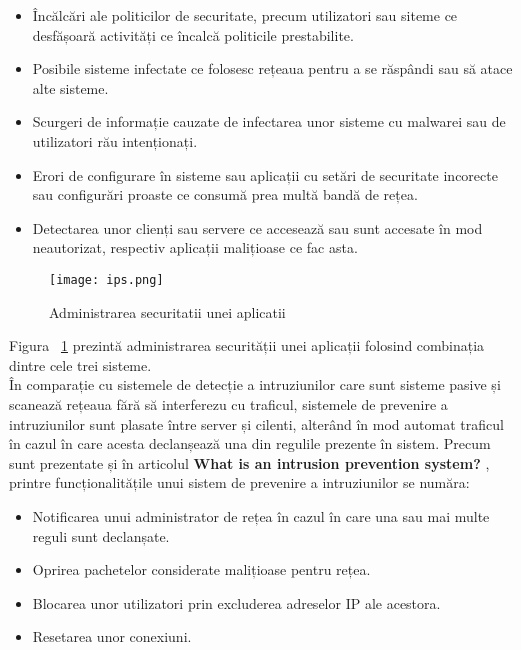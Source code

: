 \begin{itemize}
	\item  Încălcări ale politicilor de securitate, precum utilizatori sau siteme ce desfășoară activități ce încalcă politicile prestabilite. 
	\item  Posibile sisteme infectate ce folosesc rețeaua pentru a se răspândi sau să atace alte sisteme. 
	\item  Scurgeri de informație cauzate de infectarea unor sisteme cu malwarei sau de utilizatori rău intenționați. 
	\item  Erori de configurare în sisteme sau aplicații cu setări de securitate incorecte sau configurări proaste ce consumă prea multă bandă de rețea. 
	\item  Detectarea unor clienți sau servere ce accesează sau sunt accesate în mod neautorizat, respectiv aplicații malițioase ce fac asta. 
\end{itemize}
\begin{figure}[h]
	\centering
	\texttt{[image: ips.png]}
	\caption{Administrarea securitatii unei aplicatii}
	\label{fig:ips-example}
\end{figure}

Figura ~\ref{fig:ips-example}  prezintă administrarea securității unei aplicații folosind combinația dintre cele trei sisteme.  \\

În comparație cu sistemele de detecție a intruziunilor care sunt sisteme pasive și scanează rețeaua fără să interferezu cu traficul, sistemele de prevenire a intruziunilor sunt plasate între server și cilenti, alterând în mod automat traficul în cazul în care acesta declanșează una din regulile prezente în sistem. Precum sunt prezentate și în articolul  \textbf{What is an intrusion prevention system?} \cite{what_is_ips},  printre funcționalitățile unui sistem de prevenire a intruziunilor se număra:
\begin{itemize}
	\item  Notificarea unui administrator de rețea în cazul în care una sau mai multe reguli sunt declanșate. 
	\item  Oprirea pachetelor considerate malițioase pentru rețea.
	\item  Blocarea unor utilizatori prin excluderea adreselor IP ale acestora. 
	\item  Resetarea unor conexiuni. 
\end{itemize}

